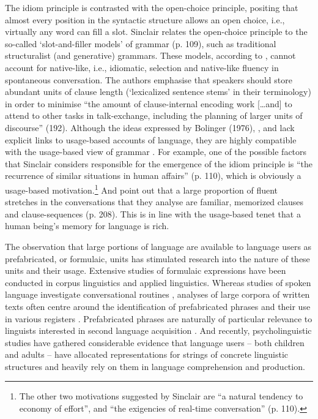 \noindent The idiom principle is contrasted with the open-choice principle, positing that almost every position in the syntactic structure allows an open choice, i.e., virtually any word can fill a slot. Sinclair relates the open-choice principle to the so-called `slot-and-filler models' of grammar (p. 109), such as traditional structuralist (and generative) grammars. These models, according to \citet{pawley-syder-1983}, cannot account for native-like, i.e., idiomatic, selection and native-like fluency in spontaneous conversation. The authors emphasise that speakers should store abundant units of clause length (`lexicalized sentence stems' in their terminology) in order to minimise ``the amount of clause-internal encoding work [\dots and] to attend to other tasks in talk-exchange, including the planning of larger units of discourse'' (192). Although the ideas expressed by Bolinger (1976), \citet{pawley-syder-1983}, and \citet{sinclair-1991} lack explicit links to usage-based accounts of language, they are highly compatible with the usage-based view of grammar \citep[cf.][]{five-graces}. For example, one of the possible factors that Sinclair considers responsible for the emergence of the idiom principle is ``the recurrence of similar situations in human affairs'' (p. 110), which is obviously a usage-based motivation.\footnote{The other two motivations suggested by Sinclair are ``a natural tendency to economy of effort'', and  ``the exigencies of real-time conversation'' (p. 110).} And \citet{pawley-syder-1983} point out that a large proportion of fluent stretches in the conversations that they analyse are familiar, memorized clauses and clause-sequences (p. 208). This is in line with the usage-based tenet that a human being's memory for language is rich.

The observation that large portions of language are available to language users as prefabricated, or formulaic, units has stimulated research into the nature of these units and their usage. Extensive studies of formulaic expressions have been conducted in corpus linguistics and applied linguistics. Whereas studies of spoken language investigate conversational routines \citep{aijmer-1996,altenberg-1990,altenberg-1998}, analyses of large corpora of written texts often centre around the identification of prefabricated phrases \citep[e.g.,][]{erman-warren-2000,gries-2010,evert-2005} and their use in various registers \citep[e.g.,][]{biber-conrad-1999,gries-mukh-2010}. Prefabricated phrases are naturally of particular relevance to linguists interested in second language acquisition \citep[e.g.,][]{granger-1998,ellis-etal-2008,biber-etal-2004,schmitt2004}. And recently, psycholinguistic studies have gathered considerable evidence that language users -- both children and adults -- have allocated representations for strings of concrete linguistic structures and heavily rely on them in language comprehension and production. 

